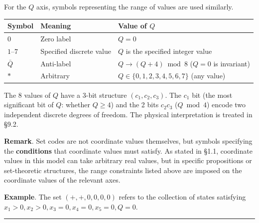 \documentclass[
  a4paper,11pt]{article}
\newcounter{none}
\theoremstyle{definition}
\theoremstyle{remark}
\begin{document}
For the \(Q\) axis, symbols representing the range of values are used
similarly.

{\def\LTcaptype{none} %
\begin{longtable}[]{@{}
  >{\centering\arraybackslash}p{}
  >{\raggedright\arraybackslash}p{}
  >{\raggedright\arraybackslash}p{}@{}}
\toprule\noalign{}
\begin{minipage}[b]{\linewidth}\centering
Symbol
\end{minipage} & \begin{minipage}[b]{\linewidth}\raggedright
Meaning
\end{minipage} & \begin{minipage}[b]{\linewidth}\raggedright
Value of \(Q\)
\end{minipage} \\
\midrule\noalign{}
\endhead
\bottomrule\noalign{}
\endlastfoot
\(0\) & Zero label & \(Q = 0\) \\
\(1\)--\(7\) & Specified discrete value & \(Q\) is the specified integer
value \\
\(\bar{Q}\) & Anti-label & \(Q \to (Q + 4) \bmod 8\) (\(Q = 0\) is
invariant) \\
\(*\) & Arbitrary & \(Q \in \{0, 1, 2, 3, 4, 5, 6, 7\}\) (any value) \\
\end{longtable}
}

The 8 values of \(Q\) have a 3-bit structure \((c_1, c_2, c_3)\). The
\(c_1\) bit (the most significant bit of \(Q\): whether \(Q \geq 4\))
and the 2 bits \(c_2 c_3\) (\(Q \bmod 4\)) encode two independent
discrete degrees of freedom. The physical interpretation is treated in
§9.2.

\textbf{Remark}. Set codes are not coordinate values themselves, but
symbols specifying the \textbf{conditions} that coordinate values must
satisfy. As stated in §1.1, coordinate values in this model can take
arbitrary real values, but in specific propositions or set-theoretic
structures, the range constraints listed above are imposed on the
coordinate values of the relevant axes.

\textbf{Example}. The set \((+, +, 0, 0, 0, 0)\) refers to the
collection of states satisfying
\(x_1 > 0, x_2 > 0, x_3 = 0, x_4 = 0, x_5 = 0, Q = 0\).

\begin{center}\rule{0.5\linewidth}{0.5pt}\end{center}
\end{document}
